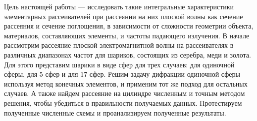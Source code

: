 
Цель настоящей работы --- исследовать такие интегральные характеристики элементарных рассеивателей при рассеянии на них плоской волны как сечение рассеяния и сечение поглощения, в зависимости от сложности геометрии объекта, материалов, составляющих элементы, и частоты падающего излучения.
В начале рассмотрим рассеяние плоской электромагнитной волны на рассеивателях в различных диапазонах частот для шариков, состоящих из серебра, меди и золота. Для этого представим шарики в виде сфер для трех случаев: для одиночной сферы, для 5 сфер и для 17 сфер. Решим задачу дифракции одиночной сферы используя метод конечных элементов, и применим тот же подход для остальных случаев. А также найдем рассеяние на цилиндре численным и точным методом решения, чтобы убедиться в правильности получаемых данных. Протестируем полученные численные схемы и проанализируем полученные результаты.
